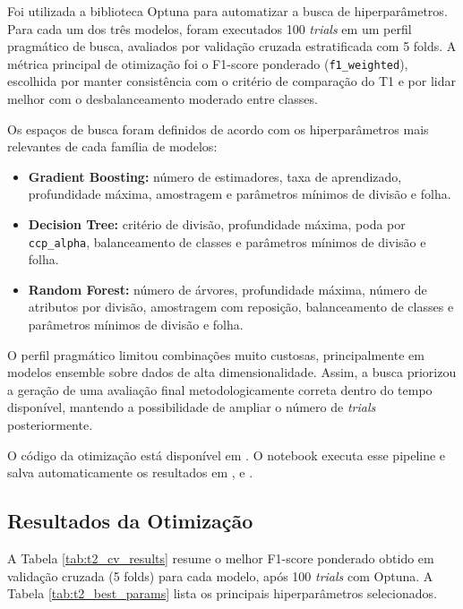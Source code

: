 \documentclass[12pt,a4paper]{article}
\begin{document}
Foi utilizada a biblioteca Optuna \cite{optuna} para automatizar a busca de hiperparâmetros. Para cada um dos três modelos, foram executados 100 \textit{trials} em um perfil pragmático de busca, avaliados por validação cruzada estratificada com 5 folds. A métrica principal de otimização foi o F1-score ponderado (\texttt{f1\_weighted}), escolhida por manter consistência com o critério de comparação do T1 e por lidar melhor com o desbalanceamento moderado entre classes.

Os espaços de busca foram definidos de acordo com os hiperparâmetros mais relevantes de cada família de modelos:

\begin{itemize}
    \item \textbf{Gradient Boosting:} número de estimadores, taxa de aprendizado, profundidade máxima, amostragem e parâmetros mínimos de divisão e folha.
    \item \textbf{Decision Tree:} critério de divisão, profundidade máxima, poda por \texttt{ccp\_alpha}, balanceamento de classes e parâmetros mínimos de divisão e folha.
    \item \textbf{Random Forest:} número de árvores, profundidade máxima, número de atributos por divisão, amostragem com reposição, balanceamento de classes e parâmetros mínimos de divisão e folha.
\end{itemize}

O perfil pragmático limitou combinações muito custosas, principalmente em modelos ensemble sobre dados de alta dimensionalidade. Assim, a busca priorizou a geração de uma avaliação final metodologicamente correta dentro do tempo disponível, mantendo a possibilidade de ampliar o número de \textit{trials} posteriormente.

O código da otimização está disponível em . O notebook  executa esse pipeline e salva automaticamente os resultados em ,  e .

\subsection{Resultados da Otimização}

A Tabela \ref{tab:t2_cv_results} resume o melhor F1-score ponderado obtido em validação cruzada (5 folds) para cada modelo, após 100 \textit{trials} com Optuna. A Tabela \ref{tab:t2_best_params} lista os principais hiperparâmetros selecionados.
\end{document}

